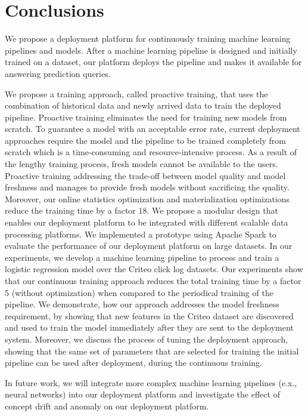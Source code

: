\section{Conclusions} \label{conclusion}
We propose a deployment platform for continuously training machine learning pipelines and models.
After a machine learning pipeline is designed and initially trained on a dataset, our platform deploys the pipeline and makes it available for answering prediction queries.

We propose a training approach, called proactive training, that uses the combination of historical data and newly arrived data to train the deployed pipeline.
Proactive training eliminates the need for training new models from scratch.
To guarantee a model with an acceptable error rate, current deployment approaches require the model and the pipeline to be trained completely from scratch which is a time-consuming and resource-intensive process.
As a result of the lengthy training process, fresh models cannot be available to the users.
Proactive training addressing the trade-off between model quality and model freshness and manages to provide fresh models without sacrificing the quality. 
Moreover, our online statistics optimization and materialization optimizations reduce the training time by a factor $18$.
We propose a modular design that enables our deployment platform to be integrated with different scalable data processing platforms.
We implemented a prototype using Apache Spark to evaluate the performance of our deployment platform on large datasets.
In our experiments, we develop a machine learning pipeline to process and train a logistic regression model over the Criteo click log datasets.
Our experiments show that our continuous training approach reduces the total training time by a factor $5$ (without optimization) when compared to the periodical training of the pipeline.
We demonstrate, how our approach addresses the model freshness requirement, by showing that new features in the Criteo dataset are discovered and used to train the model immediately after they are sent to the deployment system.
Moreover, we discuss the process of tuning the deployment approach, showing that the same set of parameters that are selected for training the initial pipeline can be used after deployment, during the continuous training.

In future work, we will integrate more complex machine learning pipelines (e.x., neural networks) into our deployment platform and investigate the effect of concept drift and anomaly on our deployment platform.

